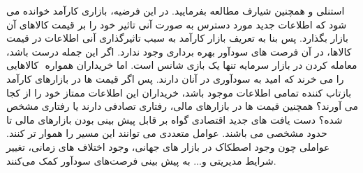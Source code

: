 \documentclass[a4paper,titlepage,12pt,fleqn,oneside]{report}
\begin{document}
  استنلی\cite{stan} و همچنین شیارف \cite{shia}مطالعه بفرمایید.  در این فرضیه، بازاری کارآمد خوانده می شود که اطلاعات جدید مورد دسترس به صورت آنی تاثیر خود را بر قیمت کالاهای آن بازار بگذارد. پس بنا به تعریف بازار کارآمد به سبب تاثیرگذاری آنی اطلاعات در قیمت کالاها، در آن فرصت های سودآور بهره برداری وجود ندارد.  اگر این جمله درست باشد، معامله کردن در بازار سرمایه تنها یک بازی شانس است.  اما خریداران همواره ‏ کالاهایی را می خرند که امید به سودآوری در آنان دارند.  پس اگر قیمت ها در بازارهای کارآمد بازتاب کننده تمامی اطلاعات موجود باشد،  خریداران این اطلاعات ممتاز خود را از کجا می آورند؟ همچنین قیمت ها در بازارهای مالی، رفتاری تصادفی دارند یا رفتاری مشخص شده؟
  دست یافت های جدید اقتصادی گواه بر قابل پیش بینی بودن بازارهای مالی تا حدود مشخصی می باشند.  عوامل متعددی می توانند این مسیر را هموار تر کنند.  عواملی چون  وجود اصطکاک در بازار های جهانی،  وجود اختلاف های زمانی،  تغییر شرایط مدیریتی و... به پیش بینی فرصت‌های سودآور کمک می‌کنند.
\end{document}
